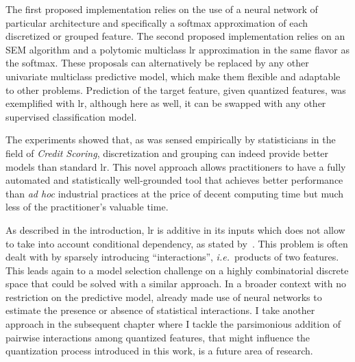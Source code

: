 The first proposed implementation relies on the use of a neural network of particular architecture and specifically a softmax approximation of each discretized or grouped feature. The second proposed implementation relies on an SEM algorithm and a polytomic multiclass \gls{lr} approximation in the same flavor as the softmax. These proposals can alternatively be replaced by any other univariate multiclass predictive model, which make them flexible and adaptable to other problems. Prediction of the target feature, given quantized features, was exemplified with \gls{lr}, although here as well, it can be swapped with any other supervised classification model.

The experiments showed that, as was sensed empirically by statisticians in the field of \textit{Credit Scoring}, discretization and grouping can indeed provide better models than standard \gls{lr}. This novel approach allows practitioners to have a fully automated and statistically well-grounded tool that achieves better performance than \textit{ad hoc} industrial practices at the price of decent computing time but much less of the practitioner's valuable time.

As described in the introduction, \gls{lr} is additive in its inputs which does not allow to take into account conditional dependency, as stated by~\cite{berry2010testing}. This problem is often dealt with by sparsely introducing ``interactions'', \textit{i.e.}\ products of two features. This leads again to a model selection challenge on a highly combinatorial discrete space that could be solved with a similar approach. In a broader context with no restriction on the predictive model, \cite{tsang2018detecting} already made use of neural networks to estimate the presence or absence of statistical interactions. I take another approach in the subsequent chapter where I tackle the parsimonious addition of pairwise interactions among quantized features, that might influence the quantization process introduced in this work, is a future area of research.




\printbibliography[heading=subbibliography, title=References of Chapter 3]

